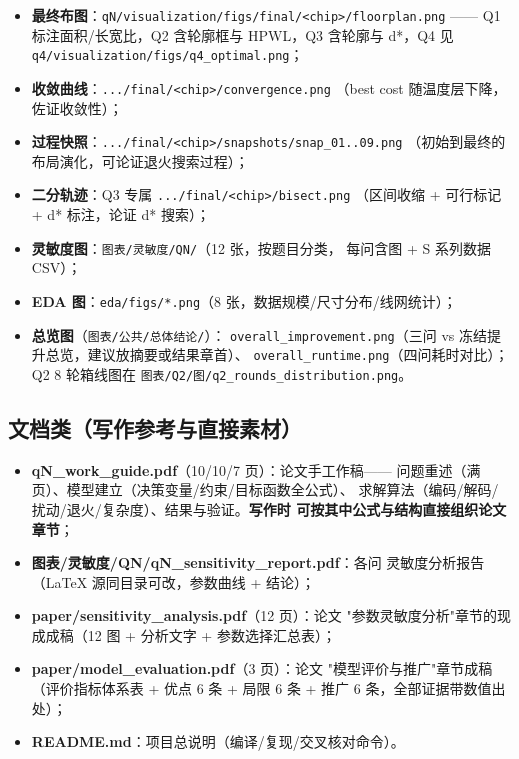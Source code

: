 \documentclass[12pt,a4paper]{article}
\begin{document}
\begin{itemize}
    \item \textbf{最终布图}：\texttt{qN/visualization/\allowbreak figs/final/\allowbreak<chip>/\allowbreak floorplan.png}
    —— Q1 标注面积/长宽比，Q2 含轮廓框与 HPWL，Q3 含轮廓与 d*，Q4 见
    \texttt{q4/visualization/\allowbreak figs/\allowbreak q4\_optimal.png}；
    \item \textbf{收敛曲线}：\texttt{.../final/\allowbreak<chip>/\allowbreak convergence.png}
    （best cost 随温度层下降，佐证收敛性）；
    \item \textbf{过程快照}：\texttt{.../final/\allowbreak<chip>/\allowbreak snapshots/\allowbreak snap\_01..09.png}
    （初始到最终的布局演化，可论证退火搜索过程）；
    \item \textbf{二分轨迹}：Q3 专属 \texttt{.../final/\allowbreak<chip>/\allowbreak bisect.png}
    （区间收缩 + 可行标记 + d* 标注，论证 d* 搜索）；
    \item \textbf{灵敏度图}：\texttt{图表/灵敏度/QN/}（12 张，按题目分类，
    每问含图 + S 系列数据 CSV）；
    \item \textbf{EDA 图}：\texttt{eda/figs/*.png}（8 张，数据规模/尺寸分布/线网统计）；
    \item \textbf{总览图}（\texttt{图表/公共/总体结论/}）：
    \texttt{overall\_improvement.png}（三问 vs 冻结提升总览，建议放摘要或结果章首）、
    \texttt{overall\_runtime.png}（四问耗时对比）；Q2 8 轮箱线图在
    \texttt{图表/Q2/图/q2\_rounds\_distribution.png}。
\end{itemize}

\subsection{文档类（写作参考与直接素材）}

\begin{itemize}
    \item \textbf{qN\_work\_guide.pdf}（10/10/7 页）：论文手工作稿——
    问题重述（满页）、模型建立（决策变量/约束/目标函数全公式）、
    求解算法（编码/解码/扰动/退火/复杂度）、结果与验证。\textbf{写作时
    可按其中公式与结构直接组织论文章节}；
    \item \textbf{图表/灵敏度/QN/qN\_sensitivity\_report.pdf}：各问
    灵敏度分析报告（LaTeX 源同目录可改，参数曲线 + 结论）；
    \item \textbf{paper/sensitivity\_analysis.pdf}（12 页）：论文
    "参数灵敏度分析"章节的现成成稿（12 图 + 分析文字 + 参数选择汇总表）；
    \item \textbf{paper/model\_evaluation.pdf}（3 页）：论文
    "模型评价与推广"章节成稿（评价指标体系表 + 优点 6 条 + 局限 6 条 +
    推广 6 条，全部证据带数值出处）；
    \item \textbf{README.md}：项目总说明（编译/复现/交叉核对命令）。
\end{itemize}
\end{document}
